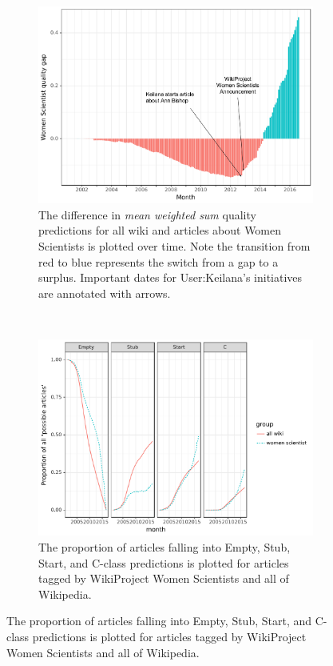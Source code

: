 \begin{figure}[p]
\centering
\begin{subfigure}[t]{\columnwidth}
  \centering
  \includegraphics[width=.9\textwidth]{figures/mean_weighted_sum_ws_vs_all}
  \caption{The difference in \emph{mean weighted sum} quality predictions for all wiki and articles about Women Scientists is plotted over time. Note the transition from red to blue represents the switch from a gap to a surplus.  Important dates for User:Keilana's initiatives are annotated with arrows.}
  \label{fig:mean_weighted_sum_ws_vs_all}
\end{subfigure}\\
\begin{subfigure}[t]{\columnwidth}
  \centering
  \includegraphics[width=.9\textwidth]{figures/proportion_empty2c_ws_vs_all}
  \caption{The proportion of articles falling into Empty, Stub, Start, and C-class predictions is plotted for articles tagged by WikiProject Women Scientists and all of Wikipedia.}

\end{subfigure}
\end{figure}
